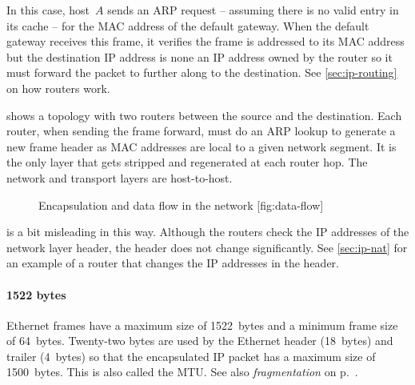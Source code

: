 In this case, host~$A$ sends an \acs{ARP} request -- assuming there is no valid entry in its cache -- for the \acs{MAC} address of the default gateway.
When the default gateway receives this frame, it verifies the frame is addressed to its \acs{MAC} address but the destination \acs{IP} address is none an \acs{IP} address owned by the router so it must forward the packet to further along to the destination.
See \vref{sec:ip-routing} on how routers work.

 shows a topology with two routers between the source and the destination.
Each router, when sending the frame forward, must do an \acs{ARP} lookup to generate a new frame header as \acs{MAC} addresses are local to a given network segment.
It is the only layer that gets stripped and regenerated at each router hop.
The network and transport layers are host-to-host.


\begin{figure}
\begin{sidecaption}%
   {Encapsulation and data flow in the network}
   [fig:data-flow]
\centering

\end{sidecaption}
\end{figure}


 is a bit misleading in this way.
Although the routers check the \acs{IP} addresses of the network layer header, the header does not change significantly.
See \vref{sec:ip-nat} for an example of a router that changes the \acs{IP} addresses in the header.


\paragraph{1522 bytes}
Ethernet frames have a maximum size of 1522~bytes and a minimum frame size of 64~bytes.
Twenty-two bytes are used by the Ethernet header (18~bytes) and trailer (4~bytes) so that the encapsulated \acs{IP} packet has a maximum size of 1500~bytes.
This is also called the \acf{MTU}.
See also \emph{fragmentation} on p.~\pageref{par:ip-fragmentation}.


